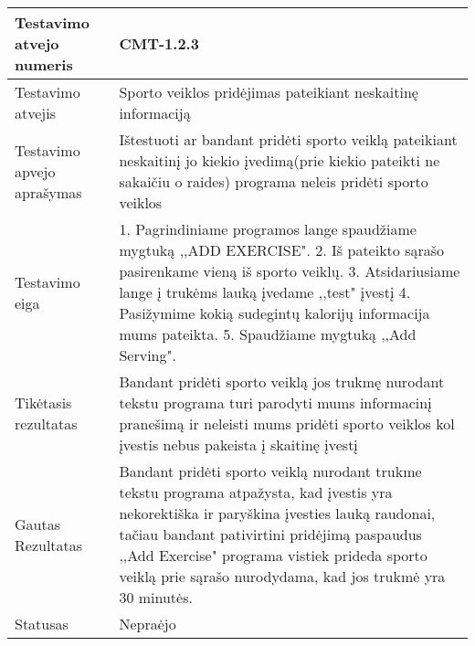 \documentclass[oneside]{VUMIFPSkursinis}
\begin{document}
\begin{center}
    \begin{tabular}{ |p{5cm}|p{13cm}|}
    \hline
    	Testavimo atvejo numeris & CMT-1.2.3 \\ \hline
    	Testavimo atvejis &Sporto veiklos pridėjimas pateikiant neskaitinę informaciją \\ \hline
	Testavimo apvejo aprašymas & Ištestuoti ar bandant pridėti sporto veiklą pateikiant neskaitinį jo kiekio įvedimą(prie kiekio pateikti ne sakaičiu o raides) programa neleis pridėti sporto veiklos  \\ \hline
	Testavimo eiga & 1. Pagrindiniame programos lange spaudžiame mygtuką ,,ADD EXERCISE". 
				2. Iš pateikto sąrašo pasirenkame vieną iš sporto veiklų. 
				3. Atsidariusiame lange į trukėms lauką įvedame ,,test" įvestį
				4. Pasižymime kokią sudegintų kalorijų informacija mums pateikta.
				5. Spaudžiame mygtuką ,,Add Serving".\\ \hline
	Tikėtasis rezultatas & Bandant pridėti sporto veiklą jos trukmę nurodant tekstu programa turi parodyti mums informacinį pranešimą ir neleisti mums pridėti sporto veiklos kol įvestis nebus pakeista į skaitinę įvestį \\ \hline
	Gautas Rezultatas & Bandant pridėti sporto veiklą nurodant trukme tekstu programa atpažysta, kad įvestis yra nekorektiška ir paryškina įvesties lauką raudonai, tačiau bandant pativirtini pridėjimą paspaudus ,,Add Exercise" programa vistiek prideda sporto veiklą prie sąrašo nurodydama, kad jos trukmė yra 30 minutės. \\ \hline
	Statusas & Nepraėjo \\ \hline
    \hline
    \end{tabular}
\end{center}
\end{document}
